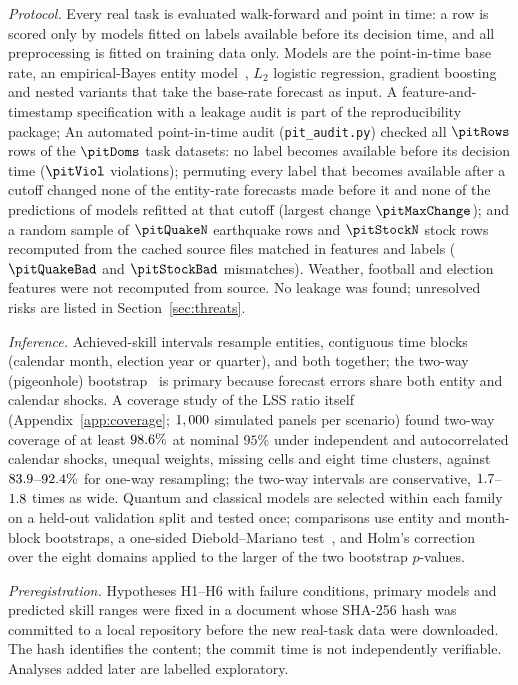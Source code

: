 \documentclass[journal]{IEEEtran}
\theoremstyle{definition}
\begin{document}
\emph{Protocol.} Every real task is evaluated walk-forward and point in time: a row is scored only by models fitted on labels available before its decision time, and all preprocessing is fitted on training data only. Models are the point-in-time base rate, an empirical-Bayes entity model~\cite{robbins1956empirical,efron1975data}, $L_2$ logistic regression, gradient boosting and nested variants that take the base-rate forecast as input. A feature-and-timestamp specification with a leakage audit is part of the reproducibility package; An automated point-in-time audit (\texttt{pit\_audit.py}) checked all $\pitRows$ rows of the $\pitDoms$ task datasets: no label becomes available before its decision time ($\pitViol$ violations); permuting every label that becomes available after a cutoff changed none of the entity-rate forecasts made before it and none of the predictions of models refitted at that cutoff (largest change $\pitMaxChange$); and a random sample of $\pitQuakeN$ earthquake rows and $\pitStockN$ stock rows recomputed from the cached source files matched in features and labels ($\pitQuakeBad$ and $\pitStockBad$ mismatches). Weather, football and election features were not recomputed from source. No leakage was found; unresolved risks are listed in Section~\ref{sec:threats}.

\emph{Inference.} Achieved-skill intervals resample entities, contiguous time blocks (calendar month, election year or quarter), and both together; the two-way (pigeonhole) bootstrap~\cite{owen2007pigeonhole} is primary because forecast errors share both entity and calendar shocks. A coverage study of the LSS ratio itself (Appendix~\ref{app:coverage}; $1,000$ simulated panels per scenario) found two-way coverage of at least $98.6\%$ at nominal $95\%$ under independent and autocorrelated calendar shocks, unequal weights, missing cells and eight time clusters, against $83.9$--$92.4\%$ for one-way resampling; the two-way intervals are conservative, $1.7$--$1.8$ times as wide. Quantum and classical models are selected within each family on a held-out validation split and tested once; comparisons use entity and month-block bootstraps, a one-sided Diebold--Mariano test~\cite{diebold1995comparing}, and Holm's correction~\cite{holm1979simple} over the eight domains applied to the larger of the two bootstrap $p$-values.

\emph{Preregistration.} Hypotheses H1--H6 with failure conditions, primary models and predicted skill ranges were fixed in a document whose SHA-256 hash was committed to a local repository before the new real-task data were downloaded. The hash identifies the content; the commit time is not independently verifiable. Analyses added later are labelled exploratory.
\end{document}
